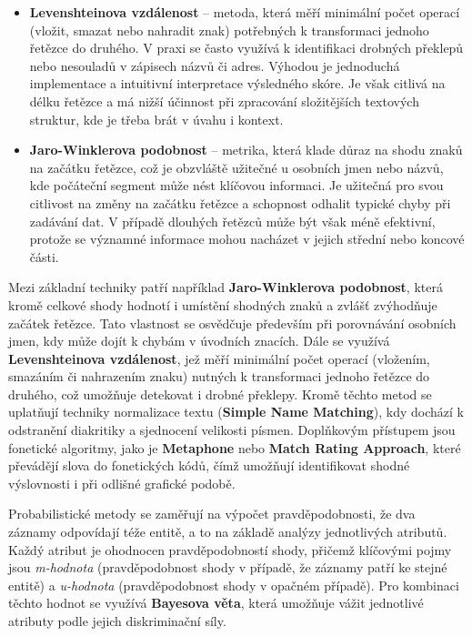\begin{itemize}
  \item{
        \textbf{Levenshteinova vzdálenost} – metoda, která měří minimální počet operací (vložit, smazat nebo nahradit znak) potřebných k transformaci jednoho řetězce do druhého. V praxi se často využívá k identifikaci drobných překlepů nebo nesouladů v zápisech názvů či adres.
        Výhodou je jednoduchá implementace a intuitivní interpretace výsledného skóre.
        Je však citlivá na délku řetězce a má nižší účinnost při zpracování složitějších textových struktur, kde je třeba brát v úvahu i kontext.
        }
  \item{\textbf{Jaro-Winklerova podobnost} – metrika, která klade důraz na shodu znaků na začátku řetězce, což je obzvláště užitečné u osobních jmen nebo názvů, kde počáteční segment může nést klíčovou informaci.
        Je užitečná pro svou citlivost na změny na začátku řetězce a schopnost odhalit typické chyby při zadávání dat.
        V případě dlouhých řetězců může být však méně efektivní, protože se významné informace mohou nacházet v jejich střední nebo koncové části. }
\end{itemize}

Mezi základní techniky patří například \textbf{Jaro-Winklerova podobnost}, která kromě celkové shody hodnotí i umístění shodných znaků a zvlášť zvýhodňuje začátek řetězce. Tato vlastnost se osvědčuje především při porovnávání osobních jmen, kdy může dojít k chybám v úvodních znacích. Dále se využívá \textbf{Levenshteinova vzdálenost}, jež měří minimální počet operací (vložením, smazáním či nahrazením znaku) nutných k transformaci jednoho řetězce do druhého, což umožňuje detekovat i drobné překlepy. Kromě těchto metod se uplatňují techniky normalizace textu (\textbf{Simple Name Matching}), kdy dochází k odstranění diakritiky a sjednocení velikosti písmen. Doplňkovým přístupem jsou fonetické algoritmy, jako je \textbf{Metaphone} nebo \textbf{Match Rating Approach}, které převádějí slova do fonetických kódů, čímž umožňují identifikovat shodné výslovnosti i při odlišné grafické podobě.

Probabilistické metody se zaměřují na výpočet pravděpodobnosti, že dva záznamy odpovídají téže entitě, a to na základě analýzy jednotlivých atributů. Každý atribut je ohodnocen pravděpodobností shody, přičemž klíčovými pojmy jsou \textit{m-hodnota} (pravděpodobnost shody v případě, že záznamy patří ke stejné entitě) a \textit{u-hodnota} (pravděpodobnost shody v opačném případě). Pro kombinaci těchto hodnot se využívá \textbf{Bayesova věta}, která umožňuje vážit jednotlivé atributy podle jejich diskriminační síly.

